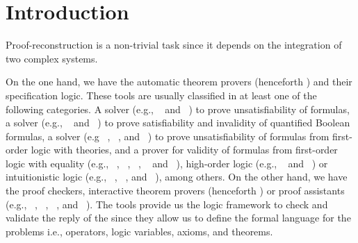 \documentclass[../main.tex]{subfiles}
\begin{document}

\section{Introduction}
\label{sec:introduction}

Proof-reconstruction is a non-trivial task since it depends on the
integration of two complex systems.

On the one hand, we have the
automatic theorem provers (henceforth \ATP) and their specification
logic. These tools are usually classified in at least one of the
following categories.
A \SAT solver (e.g., ~\cite{Moskewicz2001} and
~\cite{Een2004}) to prove unsatisfiability of \CNF
formulas, a  solver (e.g.,
~\cite{Klieber2014} and
~\cite{Lonsing2017}) to prove satisfiability and
invalidity of quantified Boolean formulas, a \SMT solver
(e.g ~\cite{Barrett2011}, ~\cite{bouton2009},
and ~\cite{DeMoura2008}) to prove unsatisfiability of
formulas from first-order logic with theories, and a prover for
validity of formulas from first-order logic with equality
(e.g., ~\cite{Schulz:AICOM-2002},
~\cite{Otten2008},
\Metis~\cite{hurd2003first},
~\cite{Weidenbach2009} and
~\cite{Riazanov1999}), high-order logic (e.g.,
~\cite{Benzmuller2008} and
~\cite{Brown2012}) or intuitionistic logic (e.g.,
~\cite{Otten2008},
~\cite{Schmitt2001}, and
~\cite{Tammet1997}), among others. On the other hand,
we have the proof checkers, interactive theorem provers (henceforth
\ITP) or proof assistants (e.g., \Agda~\cite{agdateam},
~\cite{coqteam},
~\cite{paulson1994isabelle}, and
~\cite{norrish2007hol}). The \ITP tools provide us the
logic framework to check and validate the reply of the \ATPs since
they allow us to define the formal language for the problems i.e.,
operators, logic variables, axioms, and theorems.
\end{document}
